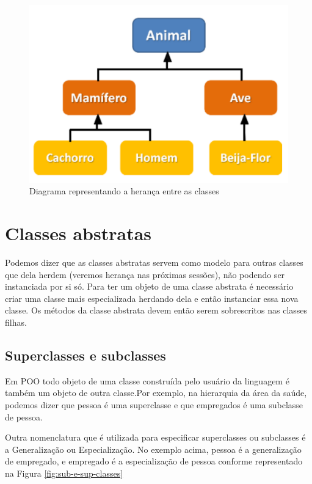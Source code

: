 \begin{figure}[H]
  \centering
  \includegraphics[scale=0.3]{imagens/heranca.png}
  \caption{Diagrama representando a herança entre as classes}
  \label{fig:heranca}
\end{figure}

\section{Classes abstratas}

Podemos dizer que as classes abstratas servem como modelo para outras classes que dela herdem (veremos herança nas próximas sessões), não podendo ser instanciada por si só. Para ter um objeto de uma classe abstrata é necessário criar uma classe mais especializada herdando dela e então instanciar essa nova classe. Os métodos da classe abstrata devem então serem sobrescritos nas classes filhas.


\subsection{Superclasses e subclasses}

Em POO todo objeto de uma classe construída pelo usuário da linguagem é também um objeto de outra classe.Por exemplo, na hierarquia da área da saúde, podemos dizer que pessoa é uma superclasse e que empregados é uma subclasse de pessoa.

Outra nomenclatura que é utilizada para especificar superclasses ou subclasses é a Generalização ou Especialização. No exemplo acima, pessoa é a generalização de empregado, e empregado é a especialização de pessoa conforme representado na Figura \ref{fig:sub-e-sup-classes}


